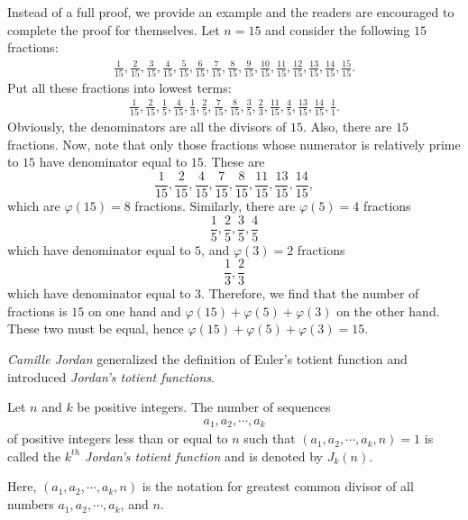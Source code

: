 \documentclass[12pt]{subfile}
\begin{document}
			Instead of a full proof, we provide an example and the readers  are encouraged to complete the proof for themselves. Let $n=15$ and consider the following $15$ fractions:
				\begin{align*}
					\frac{1}{15},
					\frac{2}{15},
					\frac{3}{15},
					\frac{4}{15},
					\frac{5}{15},
					\frac{6}{15},
					\frac{7}{15},
					\frac{8}{15},
					\frac{9}{15},
					\frac{10}{15},
					\frac{11}{15},
					\frac{12}{15},
					\frac{13}{15},
					\frac{14}{15},
					\frac{15}{15}.
				\end{align*}
			Put all these fractions into lowest terms:
				\begin{align*}
					\frac{1}{15},
					\frac{2}{15},
					\frac{1}{5},
					\frac{4}{15},
					\frac{1}{3},
					\frac{2}{5},
					\frac{7}{15},
					\frac{8}{15},
					\frac{3}{5},
					\frac{2}{3},
					\frac{11}{15},
					\frac{4}{5},
					\frac{13}{15},
					\frac{14}{15},
					\frac{1}{1}.
				\end{align*}
			Obviously, the denominators are all the divisors of $15$. Also, there are $15$ fractions. Now, note that only those fractions whose numerator is relatively prime to $15$ have denominator equal to $15$. These are $$ \frac{1}{15}, \frac{2}{15},\frac{4}{15},\frac{7}{15},\frac{8}{15},\frac{11}{15},\frac{13}{15},\frac{14}{15},$$ which are $\varphi(15)=8$ fractions. Similarly, there are $\varphi(5)=4$ fractions $$ \frac{1}{5},\frac{2}{5},\frac{3}{5},\frac{4}{5} $$ which have denominator equal to $5$, and $\varphi(3)=2$ fractions $$ \frac{1}{3},\frac{2}{3}$$ which have denominator equal to $3$. Therefore, we find that the number of fractions is $15$ on one hand and $\varphi(15)+\varphi(5)+\varphi(3)$ on the other hand. These two must be equal, hence $\varphi(15)+\varphi(5)+\varphi(3)=15$.

	\textit{Camille Jordan} generalized the definition of Euler's totient function and introduced \textit{Jordan's totient functions}.

		\begin{definition}
			Let $n$ and $k$ be positive integers. The number of sequences
				\begin{align*}
					a_1, a_2, \cdots, a_k
				\end{align*}
			of positive integers less than or equal to $n$ such that $(a_1,a_2,\cdots,a_k,n)=1$ is called the \textit{$k^{th}$ Jordan's totient function} and is denoted by $J_k(n)$.
		\end{definition}

		\begin{note}
			Here, $(a_1,a_2,\cdots,a_k,n)$ is the notation for greatest common divisor of all numbers $a_1,a_2,\cdots,a_k$, and $n$.
		\end{note}
\end{document}
